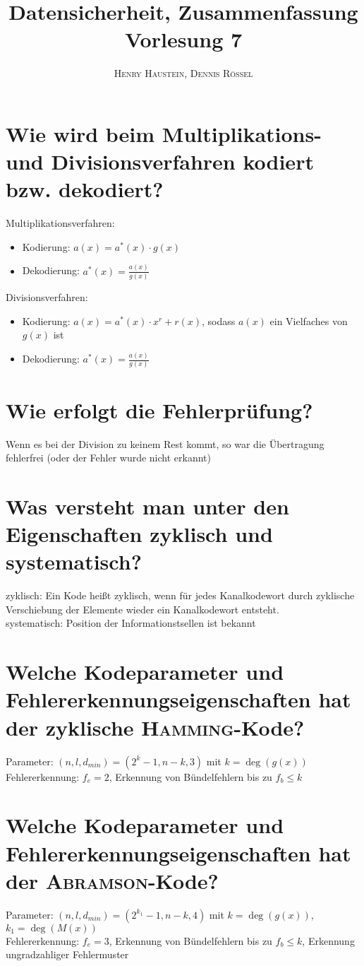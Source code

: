 \documentclass{article}
\title{\textbf{Datensicherheit, Zusammenfassung Vorlesung 7}}
\author{\textsc{Henry Haustein}, \textsc{Dennis Rössel}}
\date{}
\begin{document}
	\maketitle
	
	\section*{Wie wird beim Multiplikations- und Divisionsverfahren kodiert bzw. dekodiert?}
	Multiplikationsverfahren:
	\begin{itemize}
		\item Kodierung: $a(x) = a^\ast(x) \cdot g(x)$
		\item Dekodierung: $a^\ast(x) = \frac{a(x)}{g(x)}$
	\end{itemize}
	Divisionsverfahren:
	\begin{itemize}
		\item Kodierung: $a(x) = a^\ast(x) \cdot x^r + r(x)$, sodass $a(x)$ ein Vielfaches von $g(x)$ ist
		\item Dekodierung: $a^\ast(x) = \frac{a(x)}{g(x)}$
	\end{itemize}
	
	\section*{Wie erfolgt die Fehlerprüfung?}
	Wenn es bei der Division zu keinem Rest kommt, so war die Übertragung fehlerfrei (oder der Fehler wurde nicht erkannt)
	
	\section*{Was versteht man unter den Eigenschaften zyklisch und systematisch?}
	zyklisch: Ein Kode heißt zyklisch, wenn für jedes Kanalkodewort durch zyklische Verschiebung der Elemente wieder ein Kanalkodewort entsteht. \\
	systematisch: Position der Informationstsellen ist bekannt
	
	\section*{Welche Kodeparameter und Fehlererkennungseigenschaften hat der zyklische \textsc{Hamming}-Kode?}
	Parameter: $(n,l,d_{min}) = (2^k-1, n-k, 3)$ mit $k=\deg(g(x))$ \\
	Fehlererkennung: $f_e=2$, Erkennung von Bündelfehlern bis zu $f_b\le k$
	
	\section*{Welche Kodeparameter und Fehlererkennungseigenschaften hat der \textsc{Abramson}-Kode?}
	Parameter: $(n,l,d_{min}) = (2^{k_1}-1, n-k, 4)$ mit $k=\deg(g(x))$, $k_1 = \deg(M(x))$ \\
	Fehlererkennung: $f_e=3$, Erkennung von Bündelfehlern bis zu $f_b\le k$, Erkennung ungradzahliger Fehlermuster
	
\end{document}
